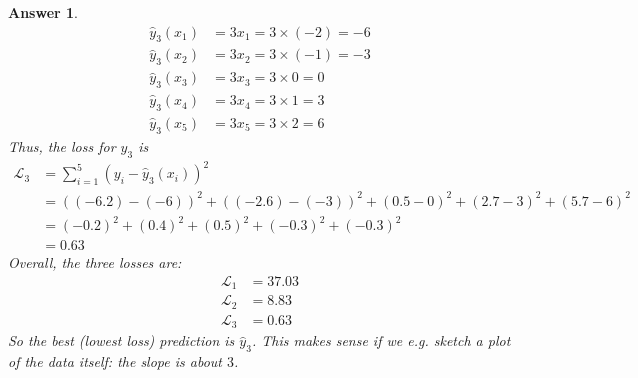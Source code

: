 \documentclass{article}
\newtheorem{answer}{Answer}
\renewcommand{\L}{\mathcal{L}}
\begin{document}
\begin{answer}
\begin{align}
    \hat{y}_3(x_1) &= 3x_1 = 3\times(-2) = -6 \\
    \hat{y}_3(x_2) &= 3x_2 = 3\times(-1) = -3\\
    \hat{y}_3(x_3) &= 3x_3 = 3\times0 = 0\\
    \hat{y}_3(x_4) &= 3x_4 = 3\times1 = 3\\
    \hat{y}_3(x_5) &= 3x_5 = 3\times2 = 6
  \end{align}
  Thus, the loss for $\hat{y}_3$ is  
  \begin{align}
    \L_3 &= \sum_{i=1}^5 (y_i - \hat{y}_3(x_i))^2\\
    \nonumber
    &= ((-6.2) - (-6))^2 + ((-2.6) - (-3))^2 + (0.5 - 0)^2 + (2.7 - 3)^2 + (5.7 - 6)^2\\
    &= (-0.2)^2 + (0.4)^2 + (0.5)^2 + (-0.3)^2 + (-0.3)^2\\
    &= 0.63
  \end{align}
  Overall, the three losses are:
  \begin{align}
    \L_1 &= 37.03\\
    \L_2 &= 8.83\\
    \L_3 &= 0.63
  \end{align}
  So the best (lowest loss) prediction is $\hat{y}_3$.  This makes sense if we e.g. sketch a plot of the data itself: the slope is about $3$.
\end{answer}
\end{document}
